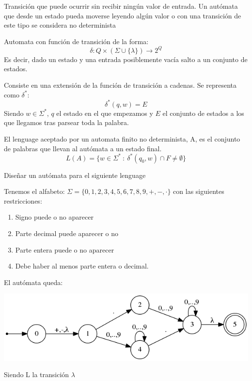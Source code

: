 \documentclass{apuntes}
\begin{document}
\begin{defn}
Transición que puede ocurrir sin recibir ningún valor de entrada. Un autómata que desde un estado pueda moverse leyendo algún valor o con una transición de este tipo se considera no determinista
\end{defn}

\begin{defn}
Automata con función de transición de la forma:
\[\delta: Q\times (\Sigma \cup \lbrace \lambda \rbrace) \rightarrow 2^Q\]
Es decir, dado un estado y una entrada posiblemente vacía salto a un conjunto de estados.
\end{defn}

\begin{defn}
Consiste en una extensión de la función de transición a cadenas. Se representa como $\delta ^*$:
\[\delta^*(q, w) = E\]
Siendo $w\in \Sigma ^*$, $q$ el estado en el que empezamos y $E$ el conjunto de estados a los que llegamos tras parsear toda la palabra.
\end{defn}

\begin{defn}
El lenguage aceptado por un automata finito no determinista, A, es el conjunto de palabras que llevan al autómata a un estado final.
\[L(A) = \lbrace w \in \Sigma^* \ : \ \delta^*(q_0, w)\cap F \neq \emptyset \rbrace\]
\end{defn}

\begin{example}
Diseñar un autómata para el siguiente lenguage

Tenemos el alfabeto: $\Sigma = \lbrace 0,1,2,3,4,5,6,7,8,9,+,-,\cdot \rbrace$ con las siguientes restricciones:
\begin{enumerate}
\item Signo puede o no aparecer
\item Parte decimal puede aparecer o no
\item Parte entera puede o no aparecer
\item Debe haber al menos parte entera o decimal.
\end{enumerate}

El autómata queda:
\begin{center}
\includegraphics[scale=0.75]{automata4.png}
\end{center}
Siendo L la transición $\lambda$
\end{example}
\end{document}

